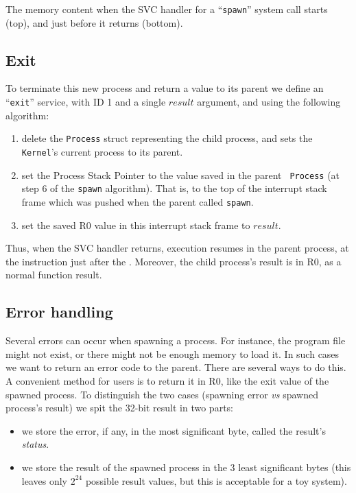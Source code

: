 \begin{Figure}
  

  \caption{The memory content when the SVC handler for a ``{\tt spawn}''
  system call starts (top), and just before it returns
  (bottom).}\label{fig:spawn-process}
\end{Figure}

\subsection{Exit}\label{subsection:exit}

To terminate this new process and return a value to its parent we define an
``{\tt exit}'' service, with ID 1 and a single $\mathit{result}$ argument, and
using the following algorithm:
\begin{enumerate}
  \item delete the {\tt Process} struct representing the child process, and
  sets the {\tt Kernel}'s current process to its parent.

  \item set the Process Stack Pointer to the value saved in the parent {\tt
  Process} (at step 6 of the {\tt spawn} algorithm). That is, to the top of the
  interrupt stack frame which was pushed when the parent called {\tt spawn}.

  \item set the saved R0 value in this interrupt stack frame to
  $\mathit{result}$.
\end{enumerate}

Thus, when the SVC handler returns, execution resumes in the parent process, at
the instruction just after the . Moreover, the child process's result
is in R0, as a normal function result.

\subsection{Error handling}\label{subsection:status_or}

Several errors can occur when spawning a process. For instance, the program
file might not exist, or there might not be enough memory to load it. In such
cases we want to return an error code to the parent. There are several ways to
do this. A convenient method for users is to return it in R0, like the exit
value of the spawned process. To distinguish the two cases (spawning error {\em
vs} spawned process's result) we spit the 32-bit result in two parts:
\begin{itemize}
  \item we store the error, if any, in the most significant byte,
  called the result's {\em status}.

  \item we store the result of the spawned process in the 3 least significant
  bytes (this leaves only $2^{24}$ possible result values, but this is
  acceptable for a toy system).
\end{itemize}

